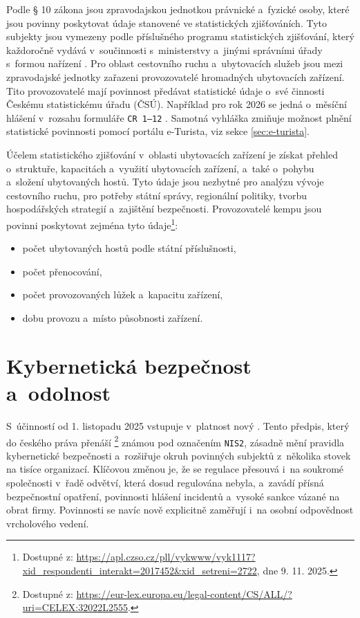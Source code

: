 Podle § 10 zákona jsou zpravodajskou jednotkou právnické a~fyzické osoby, které jsou povinny poskytovat údaje stanovené ve statistických zjišťováních.
Tyto subjekty jsou vymezeny podle příslušného programu statistických zjišťování, který každoročně vydává v~součinnosti s~ministerstvy a~jinými správními úřady s~formou nařízení \cite[\S~10]{cz-1995-89}.
Pro oblast cestovního ruchu a~ubytovacích služeb jsou mezi zpravodajské jednotky zařazeni provozovatelé hromadných ubytovacích zařízení.
Tito provozovatelé mají povinnost předávat statistické údaje o~své činnosti Českému statistickému úřadu (ČSÚ).
Například pro rok 2026 se jedná o~měsíční hlášení v~rozsahu formuláře \texttt{CR 1--12} \cite{cz-2025-445}.
Samotná vyhláška zmiňuje možnost plnění statistické povinnosti pomocí portálu e-Turista, viz sekce \ref{sec:e-turista}.

Účelem statistického zjišťování v~oblasti ubytovacích zařízení je získat přehled o~struktuře, kapacitách a~využití ubytovacích zařízení, a~také o~pohybu a~složení ubytovaných hostů.
Tyto údaje jsou nezbytné pro analýzu vývoje cestovního ruchu, pro potřeby státní správy, regionální politiky, tvorbu hospodářských strategií a~zajištění bezpečnosti.
Provozovatelé kempu jsou povinni poskytovat zejména tyto údaje\footnote{Dostupné z: \url{https://apl.czso.cz/pll/vykwww/vyk1117?xid_respondenti_interakt=2017452&xid_setreni=2722}, dne 9. 11. 2025.}:
\begin{itemize}
    \item počet ubytovaných hostů podle státní příslušnosti,
    \item počet přenocování, 
    \item počet provozovaných lůžek a~kapacitu zařízení,
    \item dobu provozu a~místo působnosti zařízení.
\end{itemize}

\section{Kybernetická bezpečnost a~odolnost}
\label{sec:01-security}
S~účinností od 1. listopadu 2025 vstupuje v~platnost nový  \cite{cz-2025-264}.
Tento předpis, který do českého práva přenáší \footnote{Dostupné z: \url{https://eur-lex.europa.eu/legal-content/CS/ALL/?uri=CELEX:32022L2555}.} známou pod označením \texttt{NIS2}, zásadně mění pravidla kybernetické bezpečnosti a~rozšiřuje okruh povinných subjektů z~několika stovek na tisíce organizací.
Klíčovou změnou je, že se regulace přesouvá i~na soukromé společnosti v~řadě odvětví, která dosud regulována nebyla, a~zavádí přísná bezpečnostní opatření, povinnosti hlášení incidentů a~vysoké sankce vázané na obrat firmy.
Povinnosti se navíc nově explicitně zaměřují i~na osobní odpovědnost vrcholového vedení.  

